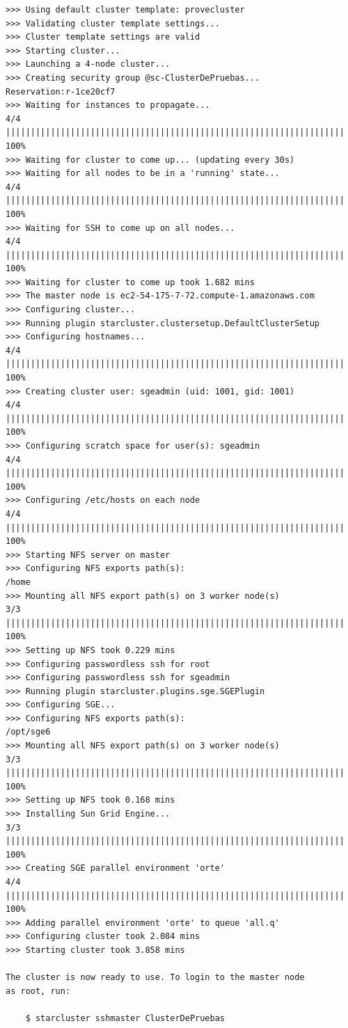 \documentclass{article}
\begin{document}
\begin{lstlisting}[style=miniBash]
>>> Using default cluster template: provecluster
>>> Validating cluster template settings...
>>> Cluster template settings are valid
>>> Starting cluster...
>>> Launching a 4-node cluster...
>>> Creating security group @sc-ClusterDePruebas...
Reservation:r-1ce20cf7
>>> Waiting for instances to propagate...
4/4 |||||||||||||||||||||||||||||||||||||||||||||||||||||||||||||||||||| 100%  
>>> Waiting for cluster to come up... (updating every 30s)
>>> Waiting for all nodes to be in a 'running' state...
4/4 |||||||||||||||||||||||||||||||||||||||||||||||||||||||||||||||||||| 100%  
>>> Waiting for SSH to come up on all nodes...
4/4 |||||||||||||||||||||||||||||||||||||||||||||||||||||||||||||||||||| 100%  
>>> Waiting for cluster to come up took 1.682 mins
>>> The master node is ec2-54-175-7-72.compute-1.amazonaws.com
>>> Configuring cluster...
>>> Running plugin starcluster.clustersetup.DefaultClusterSetup
>>> Configuring hostnames...
4/4 |||||||||||||||||||||||||||||||||||||||||||||||||||||||||||||||||||| 100%  
>>> Creating cluster user: sgeadmin (uid: 1001, gid: 1001)
4/4 |||||||||||||||||||||||||||||||||||||||||||||||||||||||||||||||||||| 100%  
>>> Configuring scratch space for user(s): sgeadmin
4/4 |||||||||||||||||||||||||||||||||||||||||||||||||||||||||||||||||||| 100%  
>>> Configuring /etc/hosts on each node
4/4 |||||||||||||||||||||||||||||||||||||||||||||||||||||||||||||||||||| 100%  
>>> Starting NFS server on master
>>> Configuring NFS exports path(s):
/home
>>> Mounting all NFS export path(s) on 3 worker node(s)
3/3 |||||||||||||||||||||||||||||||||||||||||||||||||||||||||||||||||||| 100%  
>>> Setting up NFS took 0.229 mins
>>> Configuring passwordless ssh for root
>>> Configuring passwordless ssh for sgeadmin
>>> Running plugin starcluster.plugins.sge.SGEPlugin
>>> Configuring SGE...
>>> Configuring NFS exports path(s):
/opt/sge6
>>> Mounting all NFS export path(s) on 3 worker node(s)
3/3 |||||||||||||||||||||||||||||||||||||||||||||||||||||||||||||||||||| 100%  
>>> Setting up NFS took 0.168 mins
>>> Installing Sun Grid Engine...
3/3 |||||||||||||||||||||||||||||||||||||||||||||||||||||||||||||||||||| 100%  
>>> Creating SGE parallel environment 'orte'
4/4 |||||||||||||||||||||||||||||||||||||||||||||||||||||||||||||||||||| 100%  
>>> Adding parallel environment 'orte' to queue 'all.q'
>>> Configuring cluster took 2.084 mins
>>> Starting cluster took 3.858 mins

The cluster is now ready to use. To login to the master node
as root, run:

    $ starcluster sshmaster ClusterDePruebas


\end{lstlisting}
\end{document}
